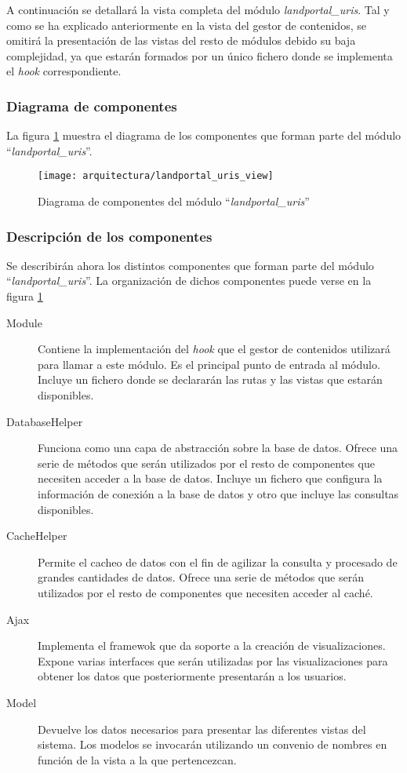 A continuación se detallará la vista completa del módulo \textit{landportal\_uris}.  Tal y como se ha explicado anteriormente en la vista del gestor de contenidos, se omitirá la presentación de las vistas del resto de módulos debido su baja complejidad, ya que estarán formados por un único fichero donde se implementa el \textit{hook} correspondiente.

\subsubsection{Diagrama de componentes}
La figura \ref{fig:diagrama_componentes_landportal_uris} muestra el diagrama de los componentes que forman parte del módulo ``\textit{landportal\_uris}''.
\begin{landscape}
	\begin{figure}[ht]
		\centering
		\texttt{[image: arquitectura/landportal\_uris\_view]}
		\caption{Diagrama de componentes del módulo ``\textit{landportal\_uris}''}
		\label{fig:diagrama_componentes_landportal_uris}
	\end{figure}
\end{landscape}


\subsubsection{Descripción de los componentes}
Se describirán ahora los distintos componentes que forman parte del módulo ``\textit{landportal\_uris}''.  La organización de dichos componentes puede verse en la figura \ref{fig:diagrama_componentes_landportal_uris}
\begin{description}
	\item[Module]  Contiene la implementación del \textit{hook} que el gestor de contenidos utilizará para llamar a este módulo.  Es el principal punto de entrada al módulo.  Incluye un fichero donde se declararán las rutas y las vistas que estarán disponibles.
	\item[DatabaseHelper]  Funciona como una capa de abstracción sobre la base de datos.  Ofrece una serie de métodos que serán utilizados por el resto de componentes que necesiten acceder a la base de datos.  Incluye un fichero que configura la información de conexión a la base de datos y otro que incluye las consultas disponibles.
	\item[CacheHelper]  Permite el cacheo de datos con el fin de agilizar la consulta y procesado de grandes cantidades de datos.  Ofrece una serie de métodos que serán utilizados por el resto de componentes que necesiten acceder al caché.
	\item[Ajax]  Implementa el framewok que da soporte a la creación de visualizaciones.  Expone varias interfaces que serán utilizadas por las visualizaciones para obtener los datos que posteriormente presentarán a los usuarios.
	\item[Model]  Devuelve los datos necesarios para presentar las diferentes vistas del sistema.  Los modelos se invocarán utilizando un convenio de nombres en función de la vista a la que pertencezcan.
\end{description}


